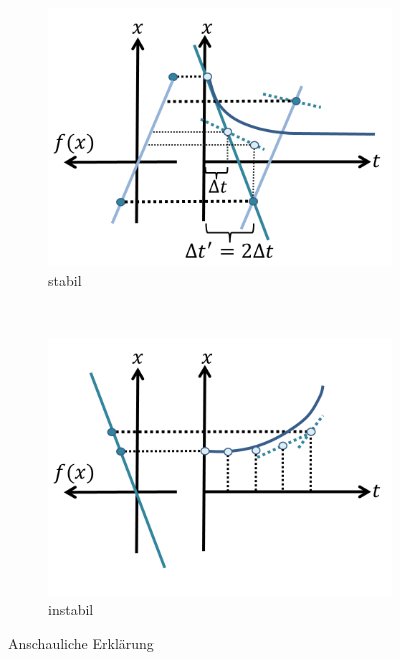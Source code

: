 \documentclass[12pt]{article}
\begin{document}
\begin{figure}[h] 
		\begin{subfigure}[h]{0.5 \textwidth}
		\centering
		\includegraphics[width=\textwidth]{Folie58.png}
		\caption{stabil} 
		\centering
	\end{subfigure}
	~
\begin{subfigure}[h]{0.5\textwidth}
		\centering
		\includegraphics[width=\textwidth]{Folie59.png}
		\caption{instabil}
		\centering
	\end{subfigure}
	\caption{Anschauliche Erklärung} \label{Anschaulich}
\end{figure}	
\end{document}
